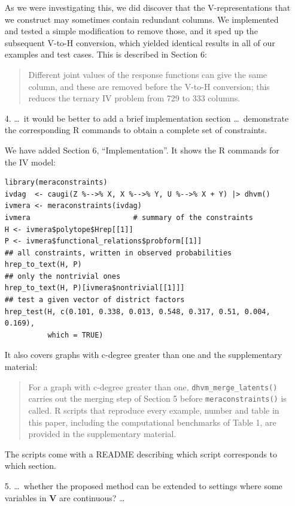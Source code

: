 \documentclass{article}
\begin{document}
\begin{enumerate}
\begin{mdframed}
        As we were investigating this, we did discover that the V-representations that we construct may sometimes contain redundant columns. We implemented and tested a simple modification to remove those, and it sped up the subsequent V-to-H conversion, which yielded identical results in all of our examples and test cases. This is described in Section 6:
        \begin{quote}
        Different joint values of the response functions can give the same column, and these are removed before the V-to-H conversion; this reduces the ternary IV problem from 729 to 333 columns.
        \end{quote}
    \end{mdframed}


    \item[4.] \ldots\, it would be better to add a brief implementation section \ldots\, demonstrate the corresponding R commands to obtain a complete set of constraints.
    \begin{mdframed}
        We have added Section 6, ``Implementation''. It shows the R commands for the IV model:
\begin{verbatim}
library(meraconstraints)
ivdag  <- caugi(Z %-->% X, X %-->% Y, U %-->% X + Y) |> dhvm()
ivmera <- meraconstraints(ivdag)
ivmera                        # summary of the constraints
H <- ivmera$polytope$Hrep[[1]]
P <- ivmera$functional_relations$probform[[1]]
## all constraints, written in observed probabilities
hrep_to_text(H, P)
## only the nontrivial ones
hrep_to_text(H, P)[ivmera$nontrivial[[1]]]
## test a given vector of district factors
hrep_test(H, c(0.101, 0.338, 0.013, 0.548, 0.317, 0.51, 0.004, 0.169),
          which = TRUE)
\end{verbatim}
        It also covers graphs with c-degree greater than one and the supplementary material:
        \begin{quote}
        For a graph with c-degree greater than one, \texttt{dhvm\_merge\_latents()} carries out the merging step of Section 5 before \texttt{meraconstraints()} is called. R scripts that reproduce every example, number and table in this paper, including the computational benchmarks of Table 1, are provided in the supplementary material.
        \end{quote}
        The scripts come with a README describing which script corresponds to which section.
    \end{mdframed}
    \item[5.] \ldots\, whether the proposed method can be extended to settings where some variables in $\mathbf{V}$ are continuous? \ldots

\end{enumerate}
\end{document}
